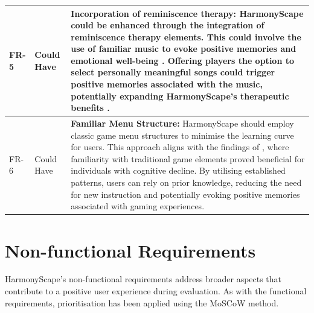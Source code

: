 \documentclass{l4proj}
\begin{document}
\begin{longtable}{|p{1.5cm}|p{1.5cm}|p{10cm}|}
\hline
FR-5 & Could Have & \textbf{Incorporation of reminiscence therapy:} HarmonyScape could be enhanced through the integration of reminiscence therapy elements. This could involve the use of familiar music to evoke positive memories and emotional well-being \citep{bhar_reminiscence_2014}. Offering players the option to select personally meaningful songs could trigger positive memories associated with the music, potentially expanding HarmonyScape's therapeutic benefits \citep{cuevas_reminiscence_2020}. \\ 
\hline
FR-6 & Could Have & \textbf{Familiar Menu Structure:} HarmonyScape should employ classic game menu structures to minimise the learning curve for users. This approach aligns with the findings of \cite{de_siqueira_review_2017}, where familiarity with traditional game elements proved beneficial for individuals with cognitive decline. By utilising established patterns, users can rely on prior knowledge, reducing the need for new instruction and potentially evoking positive memories associated with gaming experiences. \\
\end{longtable}

\section{Non-functional Requirements}
HarmonyScape's non-functional requirements address broader aspects that contribute to a positive user experience during evaluation. As with the functional requirements, prioritisation has been applied using the MoSCoW method.
\end{document}
